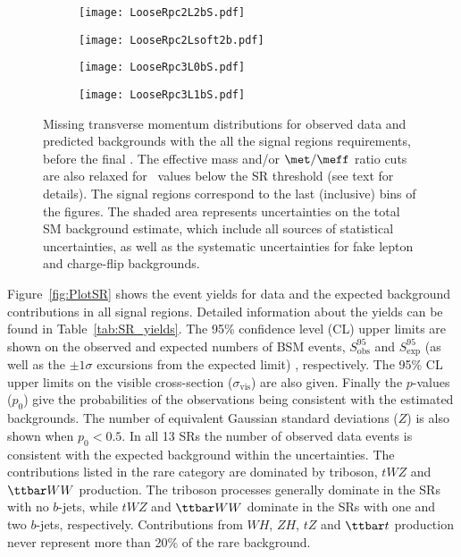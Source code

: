 \begin{figure}[htb!]
\centering
   \begin{subfigure}{0.42\textwidth}
 \texttt{[image: LooseRpc2L2bS.pdf]}
 \end{subfigure}
   \begin{subfigure}{0.42\textwidth}
 \texttt{[image: LooseRpc2Lsoft2b.pdf]}
 \end{subfigure}
   \begin{subfigure}{0.42\textwidth}
 \texttt{[image: LooseRpc3L0bS.pdf]}
 \end{subfigure}
    \begin{subfigure}{0.42\textwidth}
 \texttt{[image: LooseRpc3L1bS.pdf]}
 \end{subfigure}
   \caption{
Missing transverse momentum distributions for observed data and predicted backgrounds 
with the all the signal regions requirements, before the final \met. 
The effective mass and/or $\met/\meff$ ratio cuts are also relaxed for \met\ values below the SR threshold (see text for details). 
The signal regions correspond to the last (inclusive) bins of the figures. 
The shaded area represents uncertainties on the total SM background estimate, 
which include all sources of statistical uncertainties, 
as well as the systematic uncertainties for fake lepton and charge-flip backgrounds. 
}
\label{fig:results_datamc_rpc2}
\end{figure}


Figure~\ref{fig:PlotSR} shows the event yields for data and the expected background contributions 
in all signal regions. Detailed information about the yields can be found in Table~\ref{tab:SR_yields}.
The 95\% confidence level (CL) upper limits are shown on the observed and expected numbers of BSM events, $S_{\textrm{obs}}^{95}$ and $S_{\textrm{exp}}^{95}$ 
(as well as the $\pm 1\sigma$ excursions from the expected limit)
, respectively. The 95\% CL upper limits on the visible cross-section 
($\sigma_{\textrm{vis}}$) are also given. Finally the $p$-values ($p_{0}$) give the probabilities of the observations being consistent 
with the estimated backgrounds. The number of equivalent Gaussian standard deviations ($Z$) is also shown when $p_{0}<0.5$. 
In all 13 SRs the number of observed data events is consistent with the expected background within the uncertainties. 
The contributions listed in the rare category are dominated by triboson, $tWZ$ and $\ttbar WW$ production.
The triboson processes generally dominate in the SRs with no $b$-jets, while $tWZ$ and $\ttbar WW$
dominate in the SRs with one and two $b$-jets, respectively. Contributions from $WH$, $ZH$, $tZ$ and $\ttbar t$ production 
never represent more than 20\% of the rare background.

